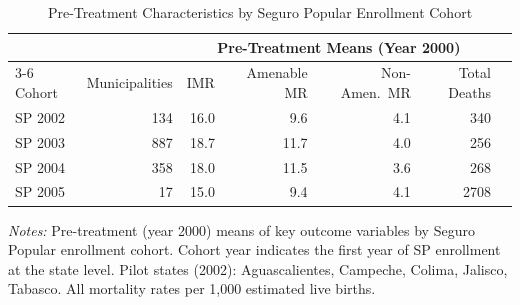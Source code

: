 \begin{table}[H]
\centering
\caption{Pre-Treatment Characteristics by Seguro Popular Enrollment Cohort}
\label{tab:cohorts}
\begin{threeparttable}
\begin{tabular}{lrrrrrr}
\toprule
 & & \multicolumn{4}{c}{Pre-Treatment Means (Year 2000)} \\
\cmidrule(lr){3-6}
Cohort & Municipalities & IMR & Amenable MR & Non-Amen.\ MR & Total Deaths \\
\midrule
SP 2002 & 134 & 16.0 & 9.6 & 4.1 & 340 \\
SP 2003 & 887 & 18.7 & 11.7 & 4.0 & 256 \\
SP 2004 & 358 & 18.0 & 11.5 & 3.6 & 268 \\
SP 2005 & 17 & 15.0 & 9.4 & 4.1 & 2708 \\
\bottomrule
\end{tabular}
\begin{tablenotes}[flushleft]
\small
\item \textit{Notes:} Pre-treatment (year 2000) means of key outcome variables by Seguro Popular enrollment cohort. Cohort year indicates the first year of SP enrollment at the state level. Pilot states (2002): Aguascalientes, Campeche, Colima, Jalisco, Tabasco. All mortality rates per 1,000 estimated live births.
\end{tablenotes}
\end{threeparttable}
\end{table}
